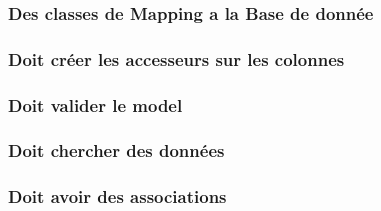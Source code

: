 \documentclass{beamer}
\begin{document}
\begin{frame}
    \frametitle{Des classes de Mapping a la Base de donn\'ee}
    \begin{center}
        
    \end{center}
\end{frame}

\begin{frame}
    \frametitle{Doit cr\'eer les accesseurs sur les colonnes}
    \begin{center}
        
    \end{center}
\end{frame}

\begin{frame}
    \frametitle{Doit valider le model}
    \begin{center}
        
    \end{center}
\end{frame}

\begin{frame}
    \frametitle{Doit chercher des donn\'ees}
    \begin{center}
        
    \end{center}
\end{frame}

\begin{frame}
    \frametitle{Doit avoir des associations}
    \begin{center}
        
    \end{center}
\end{frame}
\end{document}
